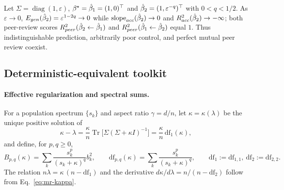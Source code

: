 \begin{example}
\label{ex:mr-dissociation}
Let $\Sigma=\operatorname{diag}(1,\varepsilon)$, ${\beta^{\star}}=\hat{\beta}_1=(1,0)^\top$
and $\hat{\beta}_2=(1,\varepsilon^{-q})^\top$ with $0<q<1/2$.  As
$\varepsilon\to0$, $E_{gen}(\hat{\beta}_2)=\varepsilon^{1-2q}\to0$ while
$\mathrm{slope}_{acc}(\hat{\beta}_2)\to0$ and $R^2_{acc}(\hat{\beta}_2)\to-\infty$; both
peer-review scores $R^2_{peer}(\hat{\beta}_2\leftarrow\hat{\beta}_1)$ and
$R^2_{peer}(\hat{\beta}_1\leftarrow\hat{\beta}_2)$ equal $1$.  
Thus indistinguishable prediction, arbitrarily poor control, and perfect mutual peer review coexist.
\end{example}

\subsection{Deterministic-equivalent toolkit}
\label{sec:mr-toolkit}

\paragraph{Effective regularization and spectral sums.}
For a population spectrum $\{s_k\}$ and aspect ratio $\gamma=d/n$, let
$\kappa=\kappa(\lambda)$ be the unique positive solution of
\begin{equation}
\kappa-\lambda=\frac{\kappa}{n}\operatorname{Tr}\!\big[\Sigma(\Sigma+\kappa I)^{-1}\big]
=\frac{\kappa}{n}\,\mathrm{df}_1(\kappa),
\label{eq:mr-kappa}
\end{equation}
and define, for $p,q\ge0$,
\begin{equation}
B_{p,q}(\kappa)=\sum_k\frac{s_k^p}{(s_k+\kappa)^q}b_k^2,\qquad
\mathrm{df}_{p,q}(\kappa)=\sum_k\frac{s_k^p}{(s_k+\kappa)^q},\qquad
\mathrm{df}_1:=\mathrm{df}_{1,1},\ \mathrm{df}_2:=\mathrm{df}_{2,2}.
\label{eq:mr-spectral-sums}
\end{equation}
The relation $n\lambda=\kappa\,(n-\mathrm{df}_1)$ and the derivative
$d\kappa/d\lambda=n/(n-\mathrm{df}_2)$ follow from Eq.~\ref{eq:mr-kappa}.
